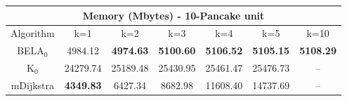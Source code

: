 \begin{tabular}{c|cccccc}\toprule
\multicolumn{7}{c}{Memory (Mbytes) - 10-Pancake unit}\\ \midrule
Algorithm & k=1 & k=2 & k=3 & k=4 & k=5 & k=10 \\ \midrule
BELA$_0$ & 4984.12 & \textbf{4974.63} & \textbf{5100.60} & \textbf{5106.52} & \textbf{5105.15} & \textbf{5108.29} \\
K$_0$ & 24279.74 & 25189.48 & 25430.95 & 25461.47 & 25476.73 & -- \\
mDijkstra & \textbf{4349.83} & 6427.34 & 8682.98 & 11608.40 & 14737.69 & -- \\ \bottomrule 
\end{tabular}

